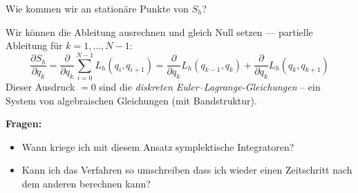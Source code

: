 Wie kommen wir an stationäre Punkte von $S_h$?

Wir können die Ableitung ausrechnen und gleich Null setzen --- partielle Ableitung für $k=1, \dots, N-1$:
\begin{equation*}
	\frac{\partial S_h}{\partial q_k}
	=
	\frac{\partial}{\partial q_k} \sum_{i=0}^{N-1} L_h (q_i, q_{i+1})
	=
	\frac{\partial}{\partial q_k} L_h(q_{k-1}, q_k) +  \frac{\partial}{\partial q_k} L_h(q_k, q_{k+1})
\end{equation*}
Dieser Ausdruck $=0$ sind die \emph{diskreten Euler--Lagrange-Gleichungen} -- ein System von algebraischen Gleichungen (mit Bandstruktur).

\textbf{Fragen:}
\begin{itemize}
	\item Wann kriege ich mit diesem Ansatz symplektische Integratoren?
	\item Kann ich das Verfahren so umschreiben dass ich wieder einen Zeitschritt nach dem anderen berechnen kann?
\end{itemize}






